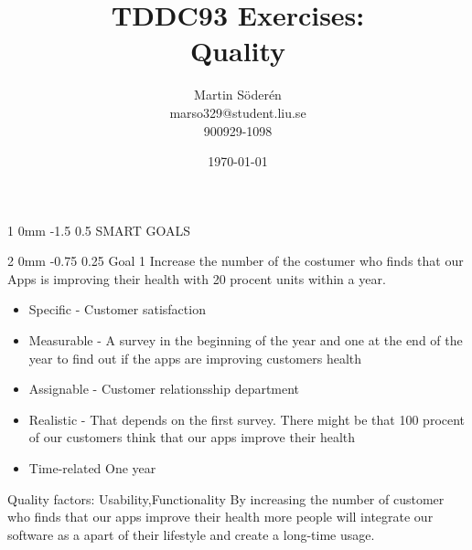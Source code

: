 \documentclass[a4paper,11pt]{article}
\makeatletter
\renewcommand{\section}{\@startsection
   {section}%
   {1}%
   {0mm}%
   {-1.5\baselineskip}%
   {0.5\baselineskip}%
   {\sffamily\bfseries\upshape\normalsize}}%
\renewcommand{\subsection}{\@startsection
   {subsection}%
   {2}%
   {0mm}%
   {-0.75\baselineskip}%
   {0.25\baselineskip}%
   {\rmfamily\normalfont\slshape\normalsize}}%
\makeatother
\begin{document}
\begin{titlepage}
\title{TDDC93 Exercises:\\
Quality}
\author{Martin Söderén\\ marso329@student.liu.se\\900929-1098}
\date{\today}
\maketitle




\vfill %

\thispagestyle{empty}

\end{titlepage}
\section{SMART GOALS}
\subsection{Goal 1}
Increase the number of the costumer who finds that our Apps is improving their health with 20 procent units within a year.
\begin{itemize}
\item Specific - Customer satisfaction
\item Measurable - A survey in the beginning of the year and one at the end of the year to find out if the apps are improving customers health
\item Assignable - Customer relationsship department
\item Realistic - That depends on the first survey. There might be that 100 procent of our customers think that our apps improve their health
\item Time-related One year
\end{itemize}
Quality factors: Usability,Functionality \newline
By increasing the number of customer who finds that our apps improve their health more people will integrate our software as a apart of their lifestyle and create a long-time usage.
\end{document}
